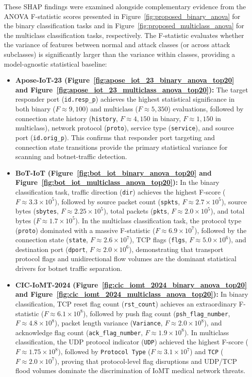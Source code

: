 \documentclass[a4paper,fleqn]{cas-sc}
\begin{document}
These SHAP findings were examined alongside complementary evidence from the ANOVA F-statistic scores presented in Figure~\ref{fig:proposed_binary_anova} for the binary classification tasks and in Figure~\ref{fig:proposed_multiclass_anova} for the multiclass classification tasks, respectively. The F-statistic evaluates whether the variance of features between normal and attack classes (or across attack subclasses) is significantly larger than the variance within classes, providing a model-agnostic statistical baseline:
\begin{itemize}
    \item \textbf{Apose-IoT-23 (Figure~\ref{fig:apose_iot_23_binary_anova_top20} and Figure~\ref{fig:apose_iot_23_multiclass_anova_top20}):} The target responder port (\texttt{id.resp\_p}) achieves the highest statistical significance in both binary ($F \approx 9,100$) and multiclass ($F \approx 5,350$) evaluations, followed by connection state history (\texttt{history}, $F \approx 4,150$ in binary, $F \approx 1,150$ in multiclass), network protocol (\texttt{proto}), service type (\texttt{service}), and source port (\texttt{id.orig\_p}). This confirms that responder port targeting and connection state transitions provide the primary statistical variance for scanning and botnet-traffic detection.
    \item \textbf{BoT-IoT (Figure~\ref{fig:bot_iot_binary_anova_top20} and Figure~\ref{fig:bot_iot_multiclass_anova_top20}):} In the binary classification task, traffic direction (\texttt{dir}) achieves the highest F-score ($F \approx 3.3 \times 10^5$), followed by source packet count (\texttt{spkts}, $F \approx 2.7 \times 10^5$), source bytes (\texttt{sbytes}, $F \approx 2.25 \times 10^5$), total packets (\texttt{pkts}, $F \approx 2.0 \times 10^5$), and total bytes ($F \approx 1.7 \times 10^5$). In the multiclass classification task, the protocol type (\texttt{proto}) dominated with a massive F-statistic ($F \approx 6.9 \times 10^7$), followed by the connection state (\texttt{state}, $F \approx 2.6 \times 10^7$), TCP flags (\texttt{flgs}, $F \approx 5.0 \times 10^6$), and destination port (\texttt{dport}, $F \approx 2.0 \times 10^6$), demonstrating that transport protocol flags and unidirectional flow volumes are the dominant statistical drivers for botnet traffic separation.
    \item \textbf{CIC-IoMT-2024 (Figure~\ref{fig:cic_iomt_2024_binary_anova_top20} and Figure~\ref{fig:cic_iomt_2024_multiclass_anova_top20}):} In binary classification, TCP reset flag count (\texttt{rst\_count}) achieves an extraordinary F-statistic ($F \approx 6.1 \times 10^8$), followed by push flag count (\texttt{psh\_flag\_number}, $F \approx 4.8 \times 10^8$), packet length variance (\texttt{Variance}, $F \approx 2.0 \times 10^8$), and acknowledge flag count (\texttt{ack\_flag\_number}, $F \approx 1.9 \times 10^8$). In multiclass classification, the UDP protocol indicator (\texttt{UDP}) achieved the highest F-score ($F \approx 1.75 \times 10^8$), followed by \texttt{Protocol Type} ($F \approx 3.1 \times 10^7$) and \texttt{TCP} ($F \approx 2.0 \times 10^7$), proving that protocol-level flag disruptions and UDP/TCP flood volumes dominate the discrimination of IoMT medical network threats.

\end{itemize}
\end{document}

